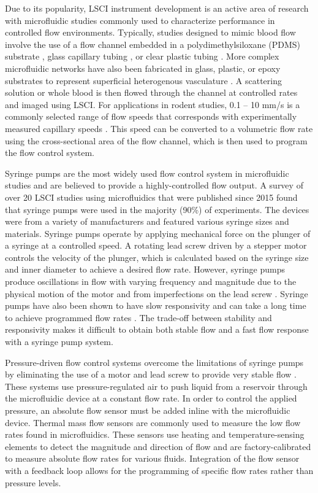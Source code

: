 \documentclass[12pt]{spieman}
\begin{document}
\begin{spacing}{2}
Due to its popularity, LSCI instrument development is an active area of research with microfluidic studies commonly used to characterize performance in controlled flow environments. Typically, studies designed to mimic blood flow involve the use of a flow channel embedded in a polydimethylsiloxane (PDMS) substrate \cite{Parthasarathy:2008el}, glass capillary tubing \cite{Arias-Cruz.2019}, or clear plastic tubing \cite{Miao:2014}. More complex microfluidic networks have also been fabricated in glass, plastic, or epoxy substrates to represent superficial heterogenous vasculature \cite{Luu.2012}. A scattering solution \cite{Parthasarathy:2008el,Arias-Cruz.2019} or whole blood \cite{Miao:2014} is then flowed through the channel at controlled rates and imaged using LSCI. For applications in rodent studies, 0.1 -- 10 mm/s is a commonly selected range of flow speeds that corresponds with experimentally measured capillary speeds \cite{Tomita:2008do}. This speed can be converted to a volumetric flow rate using the cross-sectional area of the flow channel, which is then used to program the flow control system.

Syringe pumps are the most widely used flow control system in microfluidic studies and are believed to provide a highly-controlled flow output. A survey of over 20 LSCI studies using microfluidics that were published since 2015 found that syringe pumps were used in the majority (90\%) of experiments. The devices were from a variety of manufacturers and featured various syringe sizes and materials. Syringe pumps operate by applying mechanical force on the plunger of a syringe at a controlled speed. A rotating lead screw driven by a stepper motor controls the velocity of the plunger, which is calculated based on the syringe size and inner diameter to achieve a desired flow rate. However, syringe pumps produce oscillations in flow with varying frequency and magnitude due to the physical motion of the motor and from imperfections on the lead screw \cite{Korczyk:2010eu,Li:2014ca}. Syringe pumps have also been shown to have slow responsivity and can take a long time to achieve programmed flow rates \cite{Zhou:2011ey}. The trade-off between stability and responsivity makes it difficult \cite{Kang.2012} to obtain both stable flow and a fast flow response with a syringe pump system.

Pressure-driven flow control systems overcome the limitations of syringe pumps by eliminating the use of a motor and lead screw to provide very stable flow \cite{Korczyk:2010eu,Li:2014ca,Zhou:2011ey}. These systems use pressure-regulated air to push liquid from a reservoir through the microfluidic device at a constant flow rate. In order to control the applied pressure, an absolute flow sensor must be added inline with the microfluidic device. Thermal mass flow sensors are commonly used to measure the low flow rates found in microfluidics. These sensors use heating and temperature-sensing elements to detect the magnitude and direction of flow and are factory-calibrated to measure absolute flow rates for various fluids. Integration of the flow sensor with a feedback loop allows for the programming of specific flow rates rather than pressure levels.


\end{spacing}
\end{document}
